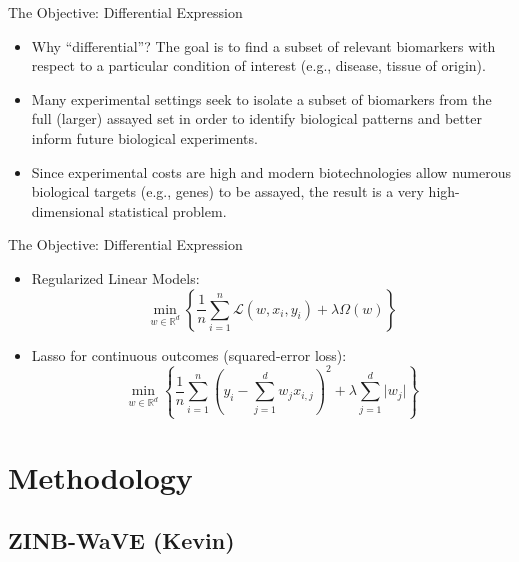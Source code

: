 \documentclass{beamer}
\newcommand{\R}{\mathbb{R}}
\newcommand{\lik}{\mathcal{L}}
\begin{document}
\begin{frame}{The Objective: Differential Expression}

\begin{itemize}
  \itemsep12pt
  \item Why ``differential''? The goal is to find a subset of relevant
    biomarkers with respect to a particular condition of interest (e.g.,
    disease, tissue of origin).
  \item Many experimental settings seek to isolate a subset of biomarkers from
    the full (larger) assayed set in order to identify biological patterns and
    better inform future biological experiments.
  \item Since experimental costs are high and modern biotechnologies allow
    numerous biological targets (e.g., genes) to be assayed, the result is a
    very high-dimensional statistical problem.
\end{itemize}

\end{frame}


\begin{frame}{The Objective: Differential Expression}

\begin{itemize}
  \itemsep12pt
  \item Regularized Linear Models:
    \[
      \min_{w \in \R^d} \left\{ \frac{1}{n} \sum_{i = 1}^n \lik(w, x_i, y_i) +
        \lambda \Omega(w) \right\}
    \]
  \item Lasso for continuous outcomes (squared-error loss):
    \[
      \min_{w \in \R^d} \left\{ \frac{1}{n} \sum_{i = 1}^n \left(y_i - \sum_{j =
        1}^d w_j x_{i,j} \right)^2 + \lambda \sum_{j = 1}^d \lvert w_j \rvert
        \right\}
    \]
\end{itemize}

\end{frame}

\section{Methodology}
\subsection{ZINB-WaVE (Kevin)}
\end{document}
